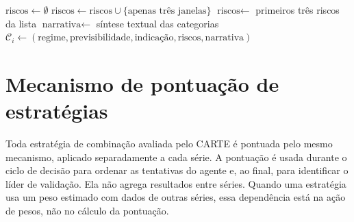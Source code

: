 \begin{algorithm}[H]
\caption{Diagnóstico interpretativo}
\footnotesize
\label{alg:diagnostico}

$\text{riscos} \gets \emptyset$
$\text{riscos} \gets \text{riscos} \cup \{\text{apenas três janelas}\}$
$\text{riscos} \gets$ primeiros três riscos da lista
$\text{narrativa} \gets$ síntese textual das categorias
$\mathcal{C}_i \gets (\text{regime}, \text{previsibilidade},
    \text{indicação}, \text{riscos}, \text{narrativa})$
\end{algorithm}


\section{Mecanismo de pontuação de estratégias} \label{sec:pontuacao}\label{subsec:pontuacao}

Toda estratégia de combinação avaliada pelo CARTE é pontuada pelo mesmo mecanismo, aplicado separadamente a cada série. A pontuação é usada durante o ciclo de decisão para ordenar as tentativas do agente e, ao final, para identificar o líder de validação. Ela não agrega resultados entre séries. Quando uma estratégia usa um peso estimado com dados de outras séries, essa dependência está na ação de pesos, não no cálculo da pontuação.

